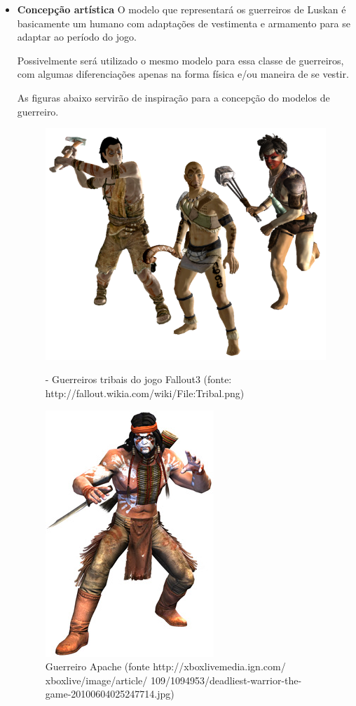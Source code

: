 \begin{itemize}
\item{\bf Concepção artística}
O modelo que representará os guerreiros de Luskan é basicamente um humano com adaptações de vestimenta e armamento para se adaptar ao período do jogo.

Possivelmente será utilizado o mesmo modelo para essa classe de guerreiros, com algumas diferenciações apenas na forma física e/ou maneira de se vestir.

As figuras abaixo servirão de inspiração para a concepção do modelos de guerreiro.
\newpage
 \begin{figure}[ht]
 \centering
 \includegraphics[scale=0.5]{Imagens/guerreiro01.png}
 \caption{- Guerreiros tribais do jogo Fallout3 (fonte: http://fallout.wikia.com/wiki/File:Tribal.png)}
\label{img:guerreiro01}
 \centering
 \includegraphics[scale=0.5]{Imagens/guerreiro02.png}
 \caption{Guerreiro Apache (fonte http://xboxlivemedia.ign.com/
 xboxlive/image/article/
 109/1094953/deadliest-warrior-the-game-20100604025247714.jpg)}
\end{figure}
\end{itemize}

